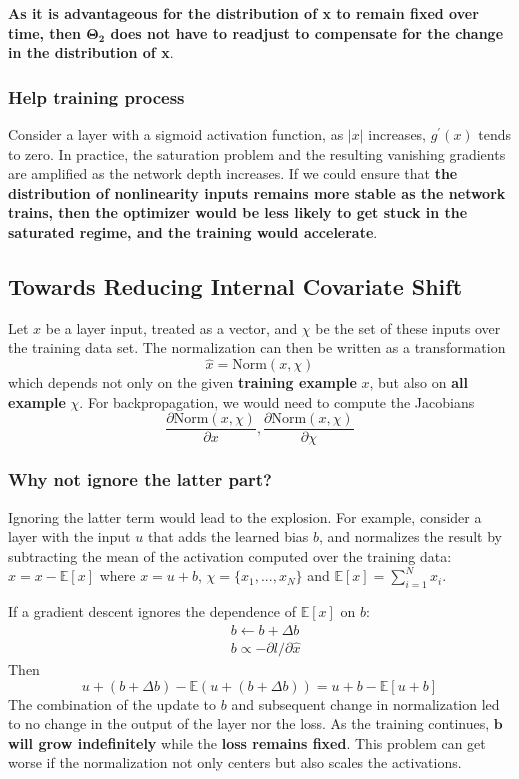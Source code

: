 \documentclass[a3paper, 12pt]{book} %
\begin{document}
\textbf{As it is advantageous for the distribution of x to remain fixed over time, then $\mathbf{\Theta_2}$ does not have to readjust to compensate for the change in the distribution of x}.

\subsubsection{Help training process}
Consider a layer with a sigmoid activation function, as $|x|$ increases, $g^{'}{(x)}$ tends to zero. In practice, the saturation problem and the resulting vanishing gradients are amplified as the network depth increases. If we could ensure that \textbf{the distribution of nonlinearity inputs remains more stable as the network trains, then the optimizer would be less likely to get stuck in the saturated regime, and the training would accelerate}.

\subsection{Towards Reducing Internal Covariate Shift}
Let $x$ be a layer input, treated as a vector, and $\chi$ be the set of these inputs over the training data set. The normalization can then be written as a transformation
$$\hat{x}=\mathrm{Norm}{(x, \chi)}$$ which depends not only on the given \textbf{training example} $x$, but also on \textbf{all example} $\chi$. For backpropagation, we would need to compute the Jacobians
\begin{equation}
\frac{\partial{\mathrm{Norm}{(x,\chi)}}}{\partial{x}}, \frac{\partial{\mathrm{Norm}{(x,\chi)}}}{\partial{\chi}}
\end{equation} 

\subsubsection{Why not ignore the latter part?}
Ignoring the latter term would lead to the explosion. For example, consider a layer
with the input $u$ that adds the learned bias $b$, and normalizes the result by subtracting the mean of the activation computed over the training data: $\hat{x}=x-\mathbb{E}[x]$ where $x=u+b$, $\chi=\{x_1,...,x_N\}$ and $\mathbb{E}[x]=\sum_{i=1}^{N}x_i$.
 
If a gradient descent ignores the dependence of $\mathbb{E}[x]$ on $b$:
\begin{equation}
\begin{split}
	& b \leftarrow b + \Delta{b} \\
    & b \propto -\partial{l} / \partial{\hat{x}}
\end{split}
\end{equation}
Then 
$$u+(b + \Delta{b})-\mathbb{E}{(u+(b + \Delta{b}))}=u+b-\mathbb{E}{[u+b]}$$
The combination of the update to $b$ and subsequent change in normalization led to no change in the output of the layer nor the loss. As the training continues, \textbf{$\mathbf{b}$ will grow indefinitely} while the \textbf{loss remains fixed}. This problem can get worse if the normalization not only centers but also scales the activations.
\end{document}
